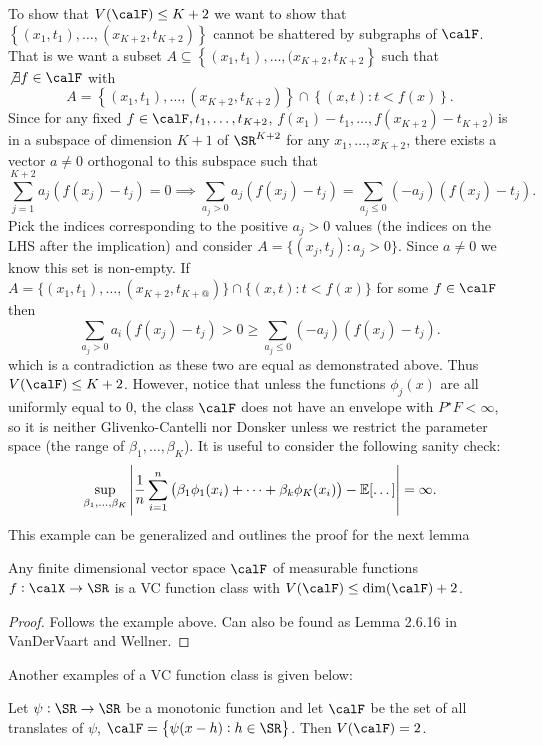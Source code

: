 \begin{example*}
	To show that \(V(\calF) \leq K+2\) we want to show that \(\left\{\left(x_1,t_1\right),\dots,\left(x_{K+2},t_{K+2}\right)\right\}\) cannot be shattered by subgraphs of \(\calF\). That is we want a subset \(A\subseteq \left\{\left(x_1,t_1\right),\dots,(x_{K+2},t_{K+2}\right\}\) such that \(\not\exists f \in \calF\) with
	\[
		A = \left\{\left(x_1,t_1\right),\dots,(x_{K+2},t_{K+2})\right\} \cap \left\{(x,t):t<f(x)\right\} 
	.\]
	Since for any fixed \(f\in\calF, t_1,\dots,t_{K+2}\), \(f(x_1)-t_1,\dots,f(x_{K+2})-t_{K+2})\) is in a subspace of dimension \(K+1\) of \(\SR^{K+2}\) for any \(x_1,\dots,x_{K+2}\), there exists a vector \(a\neq 0\) orthogonal to this subspace such that
	\[
		\sum_{j=1}^{K+2} a_j(f(x_j)-t_j) = 0 \implies \sum_{a_j > 0} a_j\left(f(x_j)-t_j\right) = \sum_{a_j \leq 0} (-a_j)(f(x_j)-t_j)
	.\]
	Pick the indices corresponding to the positive \(a_j > 0\) values (the indices on the LHS after the implication) and consider \(A = \{(x_j,t_j):a_j>0\}\). Since \(a\neq 0\) we know this set is non-empty. If \(A =\{(x_1,t_1),\dots,(x_{K+2},t_{K+@})\}  \cap \{(x,t):t<f(x)\}\) for some \(f\in\calF\) then
	\[
		\sum_{a_j > 0} a_i(f(x_j) - t_j) > 0 \geq \sum_{a_j\leq 0} (-a_j)(f(x_j)-t_j)
	.\] 
	which is a contradiction as these two are equal as demonstrated above. Thus \(V(\calF)\leq K+2\). However, notice that unless the functions \(\phi_j(x)\) are all uniformly equal to 0, the class \(\calF\) does not have an envelope with \(P^\star F <\infty\), so it is neither Glivenko-Cantelli nor Donsker unless we restrict the parameter space (the range of \(\beta_1,\dots,\beta_K\)). It is useful to consider the following sanity check: 
	\[
		\sup_{\beta_1,\dots,\beta_K} \left|\frac{1}{n}\sum_{i=1}^n\left(\beta_1\phi_1(x_i) + \dots+\beta_k\phi_K(x_i)\right) - \mathbb{E}[\dots]  \right| = \infty
	.\]  
	This example can be generalized and outlines the proof for the next lemma
\end{example*}
\begin{lemma}
	\label{lemma:vdv2.6.15}
	Any finite dimensional vector space \(\calF\) of measurable functions \(f:\calX\to\SR\) is a VC function class with \(V(\calF)\leq \text{dim}(\calF)+2\).	
\end{lemma}
\begin{proof}
	Follows the example above. Can also be found as Lemma 2.6.16 in VanDerVaart and Wellner.
\end{proof}
Another examples of a VC function class is given below:
\begin{lemma}
	\label{lemma:vdv2.6.16}
	Let \(\psi:\SR\to\SR\) be a monotonic function and let \(\calF\) be the set of all translates of \(\psi\), \(\calF = \left\{\psi(x-h):h\in\SR\right\}\). Then \(V(\calF)=2\).
\end{lemma}
